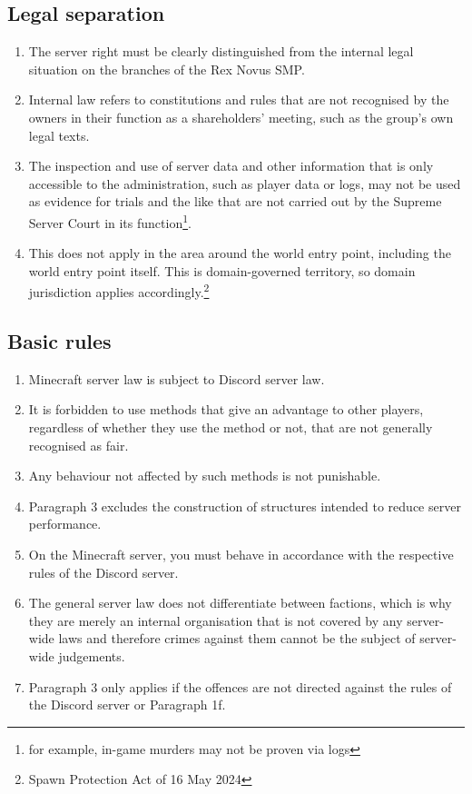 \documentclass{article}
\begin{document}
\subsection{Legal separation}
\begin{enumerate}[(1)]
	\item The server right must be clearly distinguished from the internal legal situation on the branches of the Rex Novus SMP.
	\item Internal law refers to constitutions and rules that are not recognised by the owners in their function as a shareholders' meeting, such as the group's own legal texts.
	\item The inspection and use of server data and other information that is only accessible to the administration, such as player data or logs, may not be used as evidence for trials and the like that are not carried out by the Supreme Server Court in its function\footnote{for example, in-game murders may not be proven via logs}.
	\item This does not apply in the area around the world entry point, including the world entry point itself. This is domain-governed territory, so domain jurisdiction applies accordingly.\footnote{Spawn Protection Act of 16 May 2024}
\end{enumerate}

\subsection{Basic rules}
\begin{enumerate}[(1)]
	\item Minecraft server law is subject to Discord server law.
	\item It is forbidden to use methods that give an advantage to other players, regardless of whether they use the method or not, that are not generally recognised as fair.
	\item Any behaviour not affected by such methods is not punishable.
	\item Paragraph 3 excludes the construction of structures intended to reduce server performance.
	\item On the Minecraft server, you must behave in accordance with the respective rules of the Discord server.
	\item The general server law does not differentiate between factions, which is why they are merely an internal organisation that is not covered by any server-wide laws and therefore crimes against them cannot be the subject of server-wide judgements.
	\item Paragraph 3 only applies if the offences are not directed against the rules of the Discord server or Paragraph 1f.
\end{enumerate}
\end{document}
